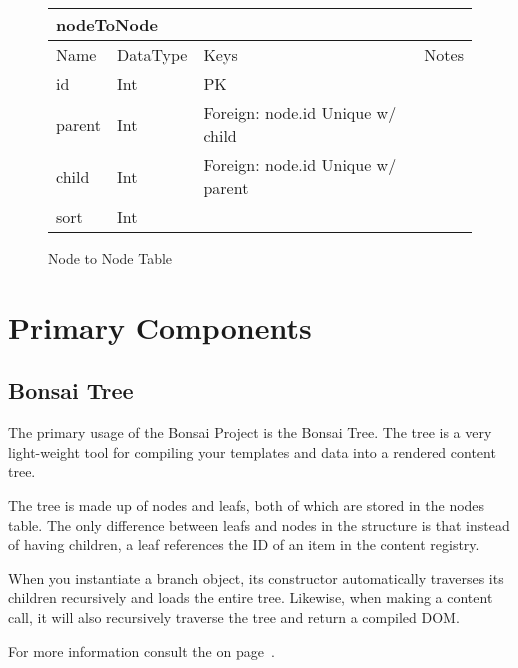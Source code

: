 \documentclass[]{book}
\begin{document}
\begin{figure}[H]
	\centering
	\caption{Node to Node Table}
	\vspace{12pt}
	\begin{tabular}{ |p{1.25in}|p{.75in}|p{2in}|p{1in}| }
		\hline
		\multicolumn{4}{|l|}{\textbf{nodeToNode}} \\
		\hline
		\hline
		Name & DataType & Keys & Notes\\
		\hline
		id & Int & PK & \\
		parent & Int & Foreign: node.id  \newline
		               Unique w/ child  & \\
		child & Int & Foreign: node.id  \newline
		              Unique w/ parent  & \\
		sort & Int &  & \\
		\hline
	\end{tabular}
\end{figure}

\chapter{Primary Components}

\section{Bonsai Tree}
\label{sec:bonsaiTree}

The primary usage of the Bonsai Project is the Bonsai Tree. The tree is a very light-weight tool for compiling your templates and data into a rendered content tree.

The tree is made up of nodes and leafs, both of which are stored in the nodes table. The only difference between leafs and nodes in the structure is that instead of having children, a leaf references the ID of an item in the content registry.

When you instantiate a branch object, its constructor automatically traverses its children recursively and loads the entire tree. Likewise, when making a content call, it will also recursively traverse the tree and return a compiled DOM.

For more information consult the  on page~\pageref{treeClassDiagram}.
\end{document}
